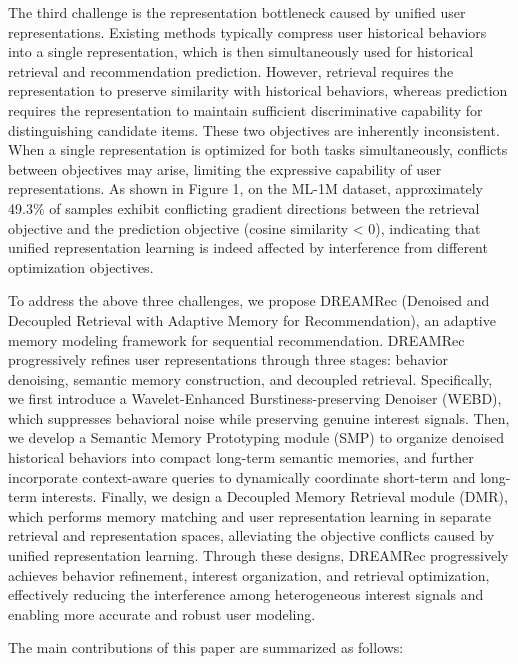 \documentclass[letterpaper]{article} %
\theoremstyle{definition} %
\begin{document}
The third challenge is the representation bottleneck caused by unified user representations. Existing methods typically compress user historical behaviors into a single representation, which is then simultaneously used for historical retrieval and recommendation prediction. However, retrieval requires the representation to preserve similarity with historical behaviors, whereas prediction requires the representation to maintain sufficient discriminative capability for distinguishing candidate items. These two objectives are inherently inconsistent. When a single representation is optimized for both tasks simultaneously, conflicts between objectives may arise, limiting the expressive capability of user representations. As shown in Figure 1, on the ML-1M dataset, approximately 49.3\% of samples exhibit conflicting gradient directions between the retrieval objective and the prediction objective (cosine similarity < 0), indicating that unified representation learning is indeed affected by interference from different optimization objectives.

To address the above three challenges, we propose DREAMRec (Denoised and Decoupled Retrieval with Adaptive Memory for Recommendation), an adaptive memory modeling framework for sequential recommendation. DREAMRec progressively refines user representations through three stages: behavior denoising, semantic memory construction, and decoupled retrieval. Specifically, we first introduce a Wavelet-Enhanced Burstiness-preserving Denoiser (WEBD), which suppresses behavioral noise while preserving genuine interest signals. Then, we develop a Semantic Memory Prototyping module (SMP) to organize denoised historical behaviors into compact long-term semantic memories, and further incorporate context-aware queries to dynamically coordinate short-term and long-term interests. Finally, we design a Decoupled Memory Retrieval module (DMR), which performs memory matching and user representation learning in separate retrieval and representation spaces, alleviating the objective conflicts caused by unified representation learning. Through these designs, DREAMRec progressively achieves behavior refinement, interest organization, and retrieval optimization, effectively reducing the interference among heterogeneous interest signals and enabling more accurate and robust user modeling.

The main contributions of this paper are summarized as follows:
\end{document}
